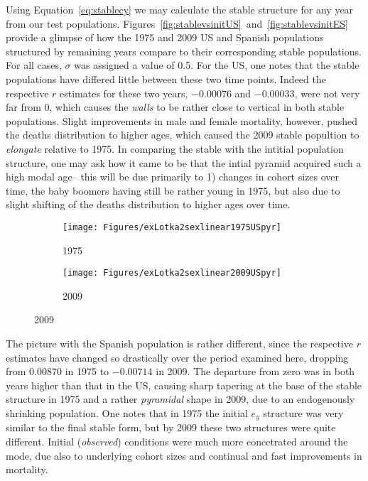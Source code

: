  \FloatBarrier

Using Equation~\eqref{eq:stablecy} we may calculate the
stable structure for any year from our test populations.
Figures~\ref{fig:stablevsinitUS}~and~\ref{fig:stablevsinitES} provide a glimpse
of how the 1975 and 2009 US and Spanish populations structured by remaining
years compare to their corresponding stable populations. For all cases,
$\sigma$ was assigned a value of 0.5. For the US, one notes that the stable
populations have differed little between these two time points. Indeed the
respective $r$ estimates for these two years, $-0.00076$ and $-0.00033$, were 
not very far from 0, which causes the \textit{walls} to be rather close to vertical in both
stable populations. Slight improvements in male and female mortality, however,
pushed the deaths distribution to higher ages, which caused the 2009 stable popultion
to \textit{elongate} relative to 1975. In comparing the stable with the intitial
population structure, one may ask how it came to be that the intial pyramid
acquired such a high modal age-- this will be due primarily to 1) changes in
cohort sizes over time, the baby boomers having still be rather young in 1975,
but also due to slight shifting of the deaths distribution to higher ages over
time.
 
\begin{figure}[!ht]
   \caption{US, stable ($\sigma = 0.05$) versus initial $e_y$-structures, 1975
   and 2009}
   \label{fig:stablevsinitUS}
        \centering
        \begin{subfigure}
                \centering
                \caption*{1975}
                \texttt{[image: Figures/exLotka2sexlinear1975USpyr]}
        \end{subfigure}
        \begin{subfigure}
                \centering
                \caption*{2009}
                \texttt{[image: Figures/exLotka2sexlinear2009USpyr]}
        \end{subfigure}
\end{figure}
 
The picture with the Spanish population is rather different, since the
respective $r$ estimates have changed so drastically over the period examined
here, dropping from $0.00870$ in 1975 to $-0.00714$ in 2009. The departure from
zero was in both years higher than that in the US, causing sharp tapering at the
base of the stable structure in 1975 and a rather \textit{pyramidal} shape in
2009, due to an endogenously shrinking population. One notes that in 1975 the
initial $e_y$ structure was very similar to the final stable form, but by 2009
these two structures were quite different. Initial (\textit{observed})
conditions were much more concetrated around the mode, due also to underlying
cohort sizes and continual and fast improvements in mortality.
 
